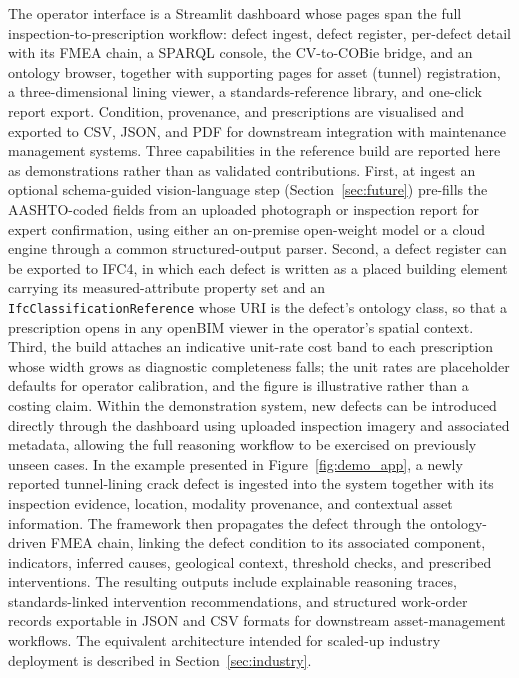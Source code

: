 \documentclass[11pt,a4paper]{article}
\begin{document}
The operator interface is a Streamlit dashboard whose pages span the full inspection-to-prescription workflow: defect ingest, defect register, per-defect detail with its FMEA chain, a SPARQL console, the CV-to-COBie bridge, and an ontology browser, together with supporting pages for asset (tunnel) registration, a three-dimensional lining viewer, a standards-reference library, and one-click report export. Condition, provenance, and prescriptions are visualised and exported to CSV, JSON, and PDF for downstream integration with maintenance management systems. Three capabilities in the reference build are reported here as demonstrations rather than as validated contributions. First, at ingest an optional schema-guided vision-language step (Section~\ref{sec:future}) pre-fills the AASHTO-coded fields from an uploaded photograph or inspection report for expert confirmation, using either an on-premise open-weight model or a cloud engine through a common structured-output parser. Second, a defect register can be exported to IFC4, in which each defect is written as a placed building element carrying its measured-attribute property set and an \texttt{IfcClassificationReference} whose URI is the defect's ontology class, so that a prescription opens in any openBIM viewer in the operator's spatial context. Third, the build attaches an indicative unit-rate cost band to each prescription whose width grows as diagnostic completeness falls; the unit rates are placeholder defaults for operator calibration, and the figure is illustrative rather than a costing claim. Within the demonstration system, new defects can be introduced directly through the dashboard using uploaded inspection imagery and associated metadata, allowing the full reasoning workflow to be exercised on previously unseen cases. In the example presented in Figure~\ref{fig:demo_app}, a newly reported tunnel-lining crack defect is ingested into the system together with its inspection evidence, location, modality provenance, and contextual asset information. The framework then propagates the defect through the ontology-driven FMEA chain, linking the defect condition to its associated component, indicators, inferred causes, geological context, threshold checks, and prescribed interventions. The resulting outputs include explainable reasoning traces, standards-linked intervention recommendations, and structured work-order records exportable in JSON and CSV formats for downstream asset-management workflows. The equivalent architecture intended for scaled-up industry deployment is described in Section~\ref{sec:industry}.
\end{document}
